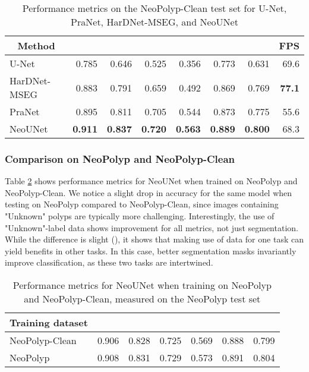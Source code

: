\documentclass[runningheads]{llncs}
\newcommand{\ModelName}{NeoUNet\xspace}
\newcommand{\DatasetName}{NeoPolyp\xspace}
\newcommand{\CleanDatasetName}{NeoPolyp-Clean\xspace}
\begin{document}
	\begin{table}[]
		\centering
		\caption{Performance metrics on the \CleanDatasetName test set for U-Net, PraNet, HarDNet-MSEG, and \ModelName}
		\label{tab:exp1}
		\begin{tabular}{@{} l r r r r r r r@{}}
			\toprule

			\multicolumn{1}{c}{Method} & \multicolumn{1}{c}{} & \multicolumn{1}{c}{} & \multicolumn{1}{c}{} & \multicolumn{1}{c}{} & \multicolumn{1}{c}{} & \multicolumn{1}{c}{} & \multicolumn{1}{c}{FPS} \\ \midrule
			U-Net \cite{ronneberger2015u} & 0.785 & 0.646 & 0.525 & 0.356 & 0.773 & 0.631 & 69.6 \\
			HarDNet-MSEG \cite{huang2021hardnet} & 0.883 & 0.791 & 0.659 & 0.492 & 0.869 & 0.769 & \textbf{77.1} \\
			PraNet \cite{fan2020pranet} & 0.895 & 0.811 & 0.705 & 0.544 & 0.873 & 0.775 & 55.6 \\
			\ModelName & \textbf{0.911} & \textbf{0.837} & \textbf{0.720} & \textbf{0.563} & \textbf{0.889} & \textbf{0.800} & 68.3 \\

			\bottomrule
		\end{tabular}
	\end{table}



	\subsubsection{Comparison on \DatasetName and \CleanDatasetName}
	Table \ref{tab:exp2} shows performance metrics for \ModelName when trained on \DatasetName and \CleanDatasetName. We notice a slight drop in accuracy for the same model when testing on \DatasetName compared to \CleanDatasetName, since images containing "Unknown" polyps are typically more challenging. Interestingly, the use of "Unknown"-label data shows improvement for all metrics, not just segmentation. While the difference is slight (), it shows that making use of data for one task can yield benefits in other tasks. In this case, better segmentation masks invariantly improve classification, as these two tasks are intertwined.

	\begin{table}[tbh]
		\centering
		\caption{Performance metrics for \ModelName when training on \DatasetName and \CleanDatasetName, measured on the \DatasetName test set}
		\label{tab:exp2}
		\begin{tabular}{@{} l r r r r r r@{}}
			\toprule
			\multicolumn{1}{c}{Training dataset} & \multicolumn{1}{c}{} & \multicolumn{1}{c}{} & \multicolumn{1}{c}{} & \multicolumn{1}{c}{} & \multicolumn{1}{c}{} & \multicolumn{1}{c}{} \\ \midrule
			\CleanDatasetName & 0.906 & 0.828 & 0.725 & 0.569 & 0.888 & 0.799 \\
			\DatasetName & 0.908 & 0.831 & 0.729 & 0.573 & 0.891 & 0.804 \\
			\bottomrule
		\end{tabular}

	\end{table}
\end{document}
